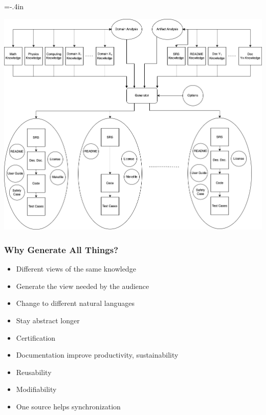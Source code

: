 \documentclass[usenames]{beamer}
\begin{document}
\hoffset=-.4in
\begin{frame}


\includegraphics[width=1.05\textwidth]{../figures/GenAllThings.png}

\end{frame}
\hoffset=0in 

\begin{frame}

\frametitle{Why Generate All Things?}

\begin{itemize}
\item Different views of the same knowledge
\item Generate the view needed by the audience
\item Change to different natural languages
\item Stay abstract longer
\item Certification
\item Documentation improve productivity, sustainability
\item Reusability
\item Modifiability
\item One source helps synchronization
\end{itemize}

\end{frame}

\end{document}
